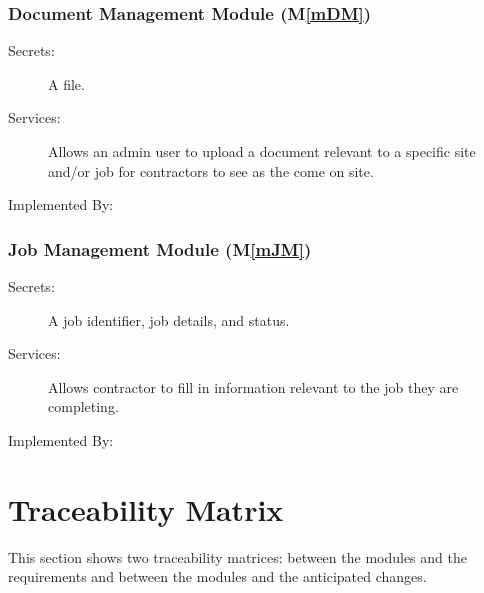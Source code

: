 \documentclass[12pt, titlepage]{article}
\newcommand{\mref}[1]{M\ref{#1}}
\begin{document}
\subsubsection{Document Management Module (\mref{mDM})}
\begin{description}
  \item[Secrets:] A file.
  \item[Services:] Allows an admin user to upload a document relevant
    to a specific site and/or job for contractors to see as the come on site.
  \item[Implemented By:] \progname
\end{description}

\subsubsection{Job Management Module (\mref{mJM})}
\begin{description}
  \item[Secrets:] A job identifier, job details, and status.
  \item[Services:] Allows contractor to fill in information relevant
    to the job they are completing.
  \item[Implemented By:] \progname
\end{description}

\section{Traceability Matrix} \label{SecTM}

This section shows two traceability matrices: between the modules and the
requirements and between the modules and the anticipated changes.
\end{document}
